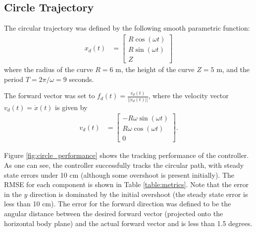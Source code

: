 \documentclass[paper=letter, fontsize=11pt]{scrartcl} %
\numberwithin{equation}{section} %
\numberwithin{figure}{section} %
\numberwithin{table}{section} %
\begin{document}
\subsection{Circle Trajectory}
The circular trajectory was defined by the following smooth parametric function:
\begin{align}
  x_d(t) &=
  \begin{bmatrix}
    R \cos(\omega t) \\
    R \sin(\omega t) \\
    Z
  \end{bmatrix}
\end{align}
where the radius of the curve $R = 6$ m, the height of the curve $Z = 5$ m,
and the period $T = 2 \pi / \omega = 9$ seconds.

The forward vector was set to $f_d(t) = \frac{v_d(t)}{||v_d(t)||}$, where the
velocity vector $v_d(t) = \dot{x}(t)$ is given by
\begin{align}
  v_d(t) &=
  \begin{bmatrix}
    -R \omega \sin(\omega t) \\
    R \omega \cos(\omega t) \\
    0
  \end{bmatrix}.
\end{align}

Figure \ref{fig:circle_performance} shows the tracking performance
of the controller. As one can see, the controller successfully tracks the circular
path, with steady state errors under 10 cm  (although some overshoot is present initially).
The RMSE for each component is shown in Table \ref{table:metrics}. Note that the
error in the $y$ direction is dominated by the initial overshoot (the steady state
error is less than 10 cm). The error for the forward direction was defined
to be the angular distance between the desired forward vector (projected onto the
horizontal body plane) and the actual forward vector and is less than 1.5 degrees.
\end{document}
